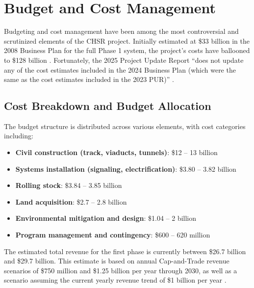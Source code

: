 \chapter{Budget and Cost Management}

Budgeting and cost management have been among the most controversial and scrutinized elements of the CHSR project. Initially estimated at \$33 billion in the 2008 Business Plan for the full Phase 1 system, the project’s costs have ballooned to \$128 billion \citep{plan2024}. Fortunately, the 2025 Project Update Report “does not update any of the cost estimates included in the 2024 Business Plan (which were the same as the cost estimates included in the 2023 PUR)” \citep{pur2025}.

\section{Cost Breakdown and Budget Allocation}
The budget structure is distributed across various elements, with cost categories including:
\begin{itemize}
	\item\textbf{Civil construction (track, viaducts, tunnels)}: \$12 – 13 billion
	\item\textbf{Systems installation (signaling, electrification)}: \$3.80 – 3.82 billion
	\item\textbf{Rolling stock}: \$3.84 – 3.85 billion
	\item\textbf{Land acquisition}: \$2.7 – 2.8 billion
	\item\textbf{Environmental mitigation and design}: \$1.04 – 2 billion
	\item\textbf{Program management and contingency}: \$600 – 620 million
\end{itemize}
The estimated total revenue for the first phase is currently between \$26.7 billion and \$29.7 billion. This estimate is based on annual Cap-and-Trade revenue scenarios of \$750 million and \$1.25 billion per year through 2030, as well as a scenario assuming the current yearly revenue trend of \$1 billion per year \citep{ureport2025}.

